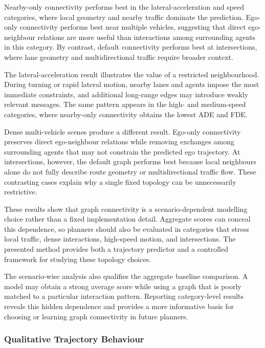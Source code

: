 Nearby-only connectivity performs best in the lateral-acceleration and speed categories, where local geometry and nearby traffic dominate the prediction. Ego-only connectivity performs best near multiple vehicles, suggesting that direct ego-neighbour relations are more useful than interactions among surrounding agents in this category. By contrast, default connectivity performs best at intersections, where lane geometry and multidirectional traffic require broader context.

The lateral-acceleration result illustrates the value of a restricted neighbourhood. During turning or rapid lateral motion, nearby lanes and agents impose the most immediate constraints, and additional long-range edges may introduce weakly relevant messages. The same pattern appears in the high- and medium-speed categories, where nearby-only connectivity obtains the lowest ADE and FDE.

Dense multi-vehicle scenes produce a different result. Ego-only connectivity preserves direct ego-neighbour relations while removing exchanges among surrounding agents that may not constrain the predicted ego trajectory. At intersections, however, the default graph performs best because local neighbours alone do not fully describe route geometry or multidirectional traffic flow. These contrasting cases explain why a single fixed topology can be unnecessarily restrictive.

These results show that graph connectivity is a scenario-dependent modelling choice rather than a fixed implementation detail. Aggregate scores can conceal this dependence, so planners should also be evaluated in categories that stress local traffic, dense interactions, high-speed motion, and intersections. The presented method provides both a trajectory predictor and a controlled framework for studying these topology choices.

The scenario-wise analysis also qualifies the aggregate baseline comparison. A model may obtain a strong average score while using a graph that is poorly matched to a particular interaction pattern. Reporting category-level results reveals this hidden dependence and provides a more informative basis for choosing or learning graph connectivity in future planners.

\subsubsection{Qualitative Trajectory Behaviour}
\label{subsubsec:magnet_qualitative_results}

